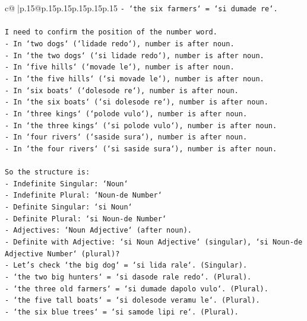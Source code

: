 \documentclass{article}
\begin{document}
{\begin{supertabular}{c@{$\;$}|p{.15\linewidth}@{}p{.15\linewidth}p{.15\linewidth}p{.15\linewidth}p{.15\linewidth}p{.15\linewidth}}
{{{\texttt{{-} `the six farmers` = `si dumade re`.} \\
\\ 
\texttt{I need to confirm the position of the number word.} \\
\texttt{{-} In `two dogs` (`lidade redo`), number is after noun.} \\
\texttt{{-} In `the two dogs` (`si lidade redo`), number is after noun.} \\
\texttt{{-} In `five hills` (`movade le`), number is after noun.} \\
\texttt{{-} In `the five hills` (`si movade le`), number is after noun.} \\
\texttt{{-} In `six boats` (`dolesode re`), number is after noun.} \\
\texttt{{-} In `the six boats` (`si dolesode re`), number is after noun.} \\
\texttt{{-} In `three kings` (`polode vulo`), number is after noun.} \\
\texttt{{-} In `the three kings` (`si polode vulo`), number is after noun.} \\
\texttt{{-} In `four rivers` (`saside sura`), number is after noun.} \\
\texttt{{-} In `the four rivers` (`si saside sura`), number is after noun.} \\
\\ 
\texttt{So the structure is:} \\
\texttt{{-} Indefinite Singular: `Noun`} \\
\texttt{{-} Indefinite Plural: `Noun{-}de Number`} \\
\texttt{{-} Definite Singular: `si Noun`} \\
\texttt{{-} Definite Plural: `si Noun{-}de Number`} \\
\texttt{{-} Adjectives: `Noun Adjective` (after noun).} \\
\texttt{{-} Definite with Adjective: `si Noun Adjective` (singular), `si Noun{-}de Adjective Number` (plural)?} \\
\texttt{{-} Let's check `the big dog` = `si lida rale`. (Singular).} \\
\texttt{{-} `the two big hunters` = `si dasode rale redo`. (Plural).} \\
\texttt{{-} `the three old farmers` = `si dumade dapolo vulo`. (Plural).} \\
\texttt{{-} `the five tall boats` = `si dolesode veramu le`. (Plural).} \\
\texttt{{-} `the six blue trees` = `si samode lipi re`. (Plural).} \\
}}}
\end{supertabular}}
\end{document}
